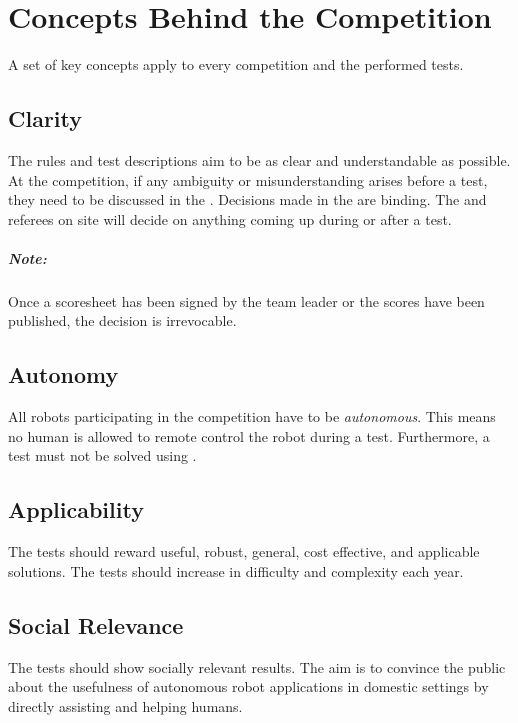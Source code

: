 \chapter{Concepts Behind the Competition}
\label{chap:concepts}
A set of key concepts apply to every \RoboCup\AtHome{} competition and the performed tests.

\section{Clarity}
\label{sec:concepts:leanrules}
The rules and test descriptions aim to be as clear and understandable as possible. At the competition, if any ambiguity or misunderstanding arises before a test, they need to be discussed in the \TLM{}. Decisions made in the  are binding. The \TC{} and referees on site will decide on anything coming up during or after a test.

\paragraph*{Note: } Once a scoresheet has been signed by the team leader or the scores have been published, the  decision is irrevocable.

\section{Autonomy}
\label{sec:concepts:autonomy}
All robots participating in the \RoboCup\AtHome{} competition have to be \emph{autonomous}. This means no human is allowed to remote control the robot during a test. Furthermore, a test must not be solved using \OLC{}.

\section{Applicability}
\label{sec:concepts:applicability}
The tests should reward useful, robust, general, cost effective, and applicable solutions. The tests should increase in difficulty and complexity each year.

\section{Social Relevance}
\label{sec:concepts:socialrelevance}
The tests should show socially relevant results. The aim is to convince the public about the usefulness of autonomous robot applications in domestic settings by directly assisting and helping humans.

